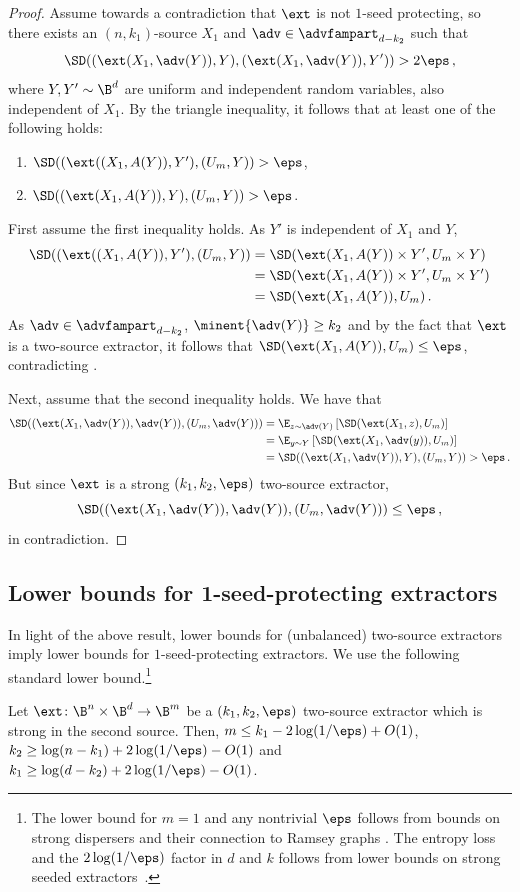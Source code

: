 \documentclass{toc}
\begin{document}
\begin{proof}
Assume towards a contradiction that $\ext$ is not $1$-seed protecting,
so there exists an $(n,k_1)$-source $X_1$ and $\adv \in \advfampart_{d-k_2}$
such that
	\[
	\SD((\ext(X_1,\adv(Y)), Y), (\ext(X_1,\adv(Y)), Y')) > 2\eps\,,
	\]
where $Y, Y' \sim \B^d$ are uniform and independent random variables, also
independent of $X_1$.
	By the triangle inequality, it follows that at least one of the following holds:
\begin{enumerate}
\item\label{it:tw-source1} $\SD((\ext((X_1,A(Y)), Y'), (U_{m}, Y)) > \eps$,
\item $\SD((\ext(X_1,A(Y)), Y), (U_{m}, Y)) > \eps$.
\end{enumerate}	
First assume the first inequality holds. As $Y'$ is independent of $X_1$ and $Y$,
\begin{align*}
\SD((\ext((X_1,A(Y)), Y'), (U_{m}, Y)) &= 
\SD(\ext(X_1,A(Y)) \times Y', U_m \times Y) \\
&= \SD(\ext(X_1,A(Y)) \times Y', U_m \times Y') \\ &= \SD(\ext(X_1,A(Y)) , U_m)\,.
\end{align*}
As $\adv \in \advfampart_{d-k_2}$, $\minent{\adv(Y)} \ge k_2$ and by the fact that $\ext$ is a two-source extractor, it follows that  $\SD(\ext(X_1,A(Y)) , U_m) \le \eps$,
contradicting .
	
Next, assume that the second inequality holds.
We have that 
\begin{align*}
	\SD((\ext(X_1,\adv(Y)), \adv(Y)), (U_{m}, \adv(Y))) &= \E_{z \sim \adv(Y)}\left[ \SD(\ext(X_1,z),U_{m}) \right] \\
	&= \E_{y \sim Y}\left[ \SD(\ext(X_1,\adv(y)),U_{m}) \right] \\
	&=\SD((\ext(X_1,\adv(Y)), Y), (U_{m}, Y)) > \eps\,.
\end{align*}
But since $\ext$ is a strong $(k_1,k_2,\eps)$ two-source extractor,
\[\SD((\ext(X_1,\adv(Y)), \adv(Y)), (U_{m}, \adv(Y))) \le \eps\,,\] in contradiction.
\end{proof}

\subsection{Lower bounds for 1-seed-protecting extractors}

%
In light of the above result, lower bounds for (unbalanced) two-source 
extractors imply lower bounds for $1$-seed-protecting extractors.
We use the following standard lower bound.\footnote{The lower bound for
$m = 1$ and any nontrivial $\eps$ follows from bounds on strong dispersers
and their connection to Ramsey graphs \cite{RTS00,BDT20}. The entropy loss
and the $2\log(1/\eps)$ factor in $d$ and $k$ follows from lower bounds
on strong seeded extractors~\cite{RTS00}.}
\begin{theorem}
Let $\ext \colon \B^{n} \times \B^{d} \rightarrow \B^{m}$ be a 
$(k_1,k_2,\eps)$ two-source extractor which is strong in the second source. Then,
$m \le k_1 - 2\log(1/\eps)+O(1)$, $k_2 \ge \log(n-k_1)+2\log(1/\eps)-O(1)$
and $k_1 \ge \log(d-k_2)+2\log(1/\eps)-O(1)$.
\end{theorem}
\end{document}
